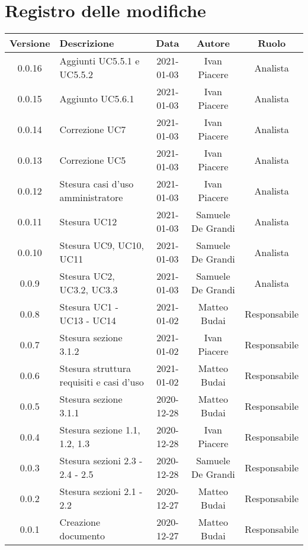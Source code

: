 \section*{Registro delle modifiche}

\begin{center}
	\begin{longtable}{|c|p{5cm}|c|c|c|}
		\hline
		\rowcolor{lighter-grayer}
		\textbf{Versione} & \textbf{Descrizione} & \textbf{Data} & \textbf{Autore} & \textbf{Ruolo} \\
		\hline
		\endfirsthead
		
		0.0.16 & Aggiunti UC5.5.1 e UC5.5.2 & 2021-01-03 & Ivan Piacere & Analista \\
		\hline
		0.0.15 & Aggiunto UC5.6.1 & 2021-01-03 & Ivan Piacere & Analista \\
		\hline
		0.0.14 & Correzione UC7 & 2021-01-03 & Ivan Piacere & Analista \\
		\hline
		0.0.13 & Correzione UC5 & 2021-01-03 & Ivan Piacere & Analista \\
		\hline
		0.0.12 & Stesura casi d'uso amministratore & 2021-01-03 & Ivan Piacere & Analista \\
		\hline
		0.0.11 & Stesura UC12  & 2021-01-03 & Samuele De Grandi & Analista \\
		\hline
	    0.0.10 & Stesura UC9, UC10, UC11  & 2021-01-03 & Samuele De Grandi & Analista \\
		\hline
		0.0.9 & Stesura UC2, UC3.2, UC3.3  & 2021-01-03 & Samuele De Grandi & Analista \\
		\hline
		0.0.8 & Stesura UC1 - UC13 - UC14 & 2021-01-02 & Matteo Budai & Responsabile \\
		\hline
		0.0.7 & Stesura sezione 3.1.2 & 2021-01-02 & Ivan Piacere & Responsabile\\
		\hline
		0.0.6 & Stesura struttura requisiti e casi d'uso & 2021-01-02 & Matteo Budai & Responsabile \\
		\hline
		0.0.5 & Stesura sezione 3.1.1 & 2020-12-28 & Matteo Budai & Responsabile \\
		\hline
		0.0.4 & Stesura sezione 1.1, 1.2, 1.3 & 2020-12-28 & Ivan Piacere & Responsabile \\
		\hline
		0.0.3 & Stesura sezioni 2.3 - 2.4 - 2.5 & 2020-12-28 & Samuele De Grandi & Responsabile \\
		\hline
		0.0.2 & Stesura sezioni 2.1 - 2.2 & 2020-12-27 & Matteo Budai & Responsabile \\
		\hline
		0.0.1 & Creazione documento & 2020-12-27 & Matteo Budai & Responsabile \\
		\hline
		
	\end{longtable}
\end{center}
